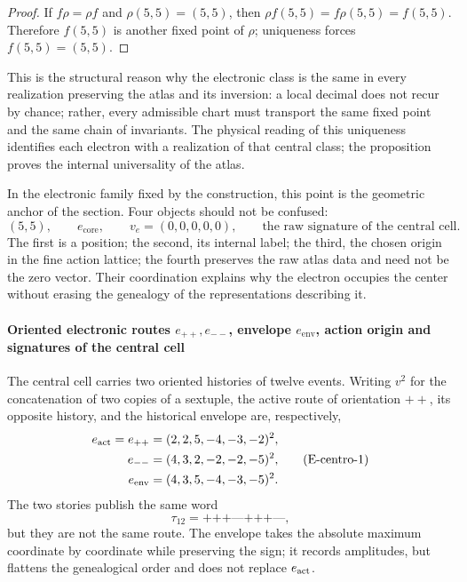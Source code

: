 \begin{proof}
If \(f\rho=\rho f\) and \(\rho(5,5)=(5,5)\), then
\(\rho f(5,5)=f\rho(5,5)=f(5,5)\). Therefore \(f(5,5)\) is another fixed point
of \(\rho\); uniqueness forces \(f(5,5)=(5,5)\).
\end{proof}

This is the structural reason why the electronic class is the same in
every realization preserving the atlas and its inversion: a local decimal does not
recur by chance; rather, every admissible chart must
transport the same fixed point and the same chain of invariants. The
physical reading of this uniqueness identifies each electron with a realization of that
central class; the proposition proves the internal universality of the atlas.

In the electronic family fixed by the construction, this point is the geometric
anchor of the section. Four objects should not be confused:
\[
 (5,5),\qquad
 e_{\mathrm{core}},\qquad
 v_e=(0,0,0,0,0),\qquad
 \text{the raw signature of the central cell}.
\]
The first is a position; the second, its internal label; the third,
the chosen origin in the fine action lattice; the fourth preserves the
raw atlas data and need not be the zero vector. Their
coordination explains why the electron occupies the center without erasing the
genealogy of the representations describing it.

\paragraph{Oriented electronic routes \(e_{++},e_{--}\), envelope \(e_{\mathrm{env}}\), action origin and signatures of the central cell}
The central cell carries two oriented histories of twelve events. Writing
\(v^2\) for the concatenation of two copies of a sextuple, the active
route of orientation \({++}\), its opposite history, and the historical
envelope are, respectively,
\[
\begin{aligned}
 e_{\rm act}=e_{++}
   &=(2,2,5,-4,-3,-2)^2,\\
 e_{--}
   &=(4,3,2,-2,-2,-5)^2,\\
 e_{\rm env}
   &=(4,3,5,-4,-3,-5)^2.
\end{aligned}
\tag{E-centro-1}\label{eq:electron-rutas-finas-rev8}
\]
The two stories publish the same word
\[
 \tau_{12}=\texttt{+++---+++---},
\]
but they are not the same route. The envelope takes the absolute maximum
coordinate by coordinate while preserving the sign; it records amplitudes, but
flattens the genealogical order and does not replace \(e_{\rm act}\).

